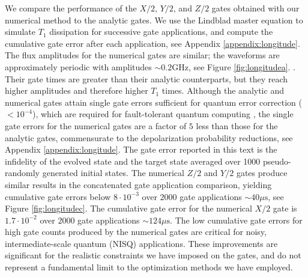 We compare the performance of the $X/2$, $Y/2$, and $Z/2$ gates obtained with
our numerical method to the analytic gates. We
use the Lindblad master equation to simulate $T_{1}$ dissipation for successive
gate applications, and compute the cumulative gate error
after each application, see Appendix \ref{appendix:longitude}.
The flux amplitudes for the numerical gates are similar; the
waveforms are approximately periodic
with amplitudes $\sim 0.2 \textrm{GHz}$, see Figure \ref{fig:longitudea}. .
Their gate times are greater
than their analytic counterparts, but they
reach higher amplitudes and therefore higher $T_{1}$ times.
Although the analytic and numerical gates attain single gate errors sufficient for
quantum error correction ($< 10^{-4}$), which are required for fault-tolerant quantum computing
\cite{aharonov2008fault, fowler2009high, gottesman1997stabilizer},
the single gate errors for the numerical
gates are a factor of $5$ less
than those for the analytic gates, commensurate to the
depolarization probability reductions, see Appendix \ref{appendix:longitude}.
The gate error reported in this text is the infidelity
of the evolved state and the target state averaged over 1000 pseudo-randomly
generated initial states.
The numerical $Z/2$ and $Y/2$ gates produce similar
results in the concatenated gate application comparison,
yielding cumulative gate errors below $8 \cdot 10^{-3}$
over $2000$ gate applications $\sim 40 \mu\textrm{s}$, see Figure \ref{fig:longitudec}.
The cumulative gate error for the numerical $X/2$ gate is
$1.7 \cdot 10^{-2}$ over $2000$ gate applications $\sim 124 \mu\textrm{s}$.
The low cumulative gate errors for high gate counts produced
by the numerical gates are critical for
noisy, intermediate-scale quantum (NISQ) applications.
These improvements are significant for the realistic constraints we have imposed
on the gates, and do not represent a fundamental limit to the optimization methods we have
employed.
